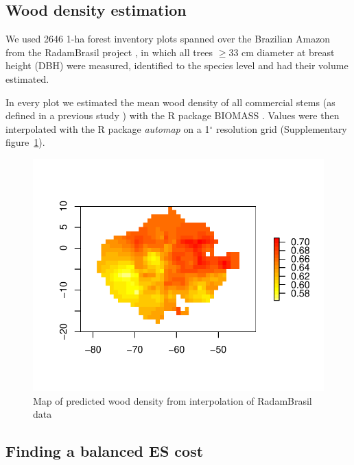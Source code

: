 \documentclass{article}
\begin{document}
\subsection{Wood density estimation}
\label{supmat:wdext}

We used 2646 1-ha forest inventory plots spanned over the Brazilian Amazon from the RadamBrasil project \cite{Radam2017}, in which all trees $\geq$33 cm diameter at breast height (DBH) were measured, identified to the species level and had their volume estimated. 

In every plot we estimated the mean wood density of all commercial stems (as defined in a previous study \cite{Piponiotc}) with the R package BIOMASS \cite{Rejou-Mechain2017}.
Values were then interpolated with the R package \textit{automap} \cite{gstat} on a 1$^{\circ}$ resolution grid (Supplementary figure~\ref{sfig:wdext}).

\begin{figure}
    \centering
    \includegraphics[width=0.7\linewidth]{graphs/map_WDext.pdf}
    \caption{Map of predicted wood density from interpolation of RadamBrasil data}
    \label{sfig:wdext}
\end{figure}

\subsection{Finding a balanced ES cost}
\end{document}
